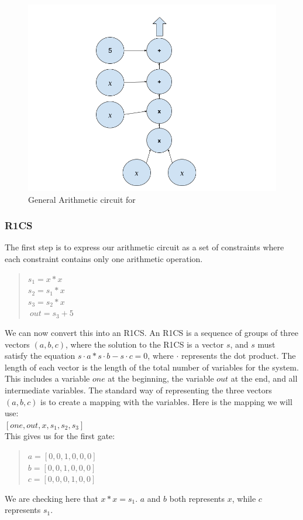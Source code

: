 \begin{figure}[H]
\centering
\includegraphics[width=130mm]{ArithmeticCircuit.png}
\caption{General Arithmetic circuit for }
\label{overflow}
\end{figure}

\subsubsection{R1CS}
\label{subsec:r1cs}
The first step is to express our arithmetic circuit as a set of constraints where each constraint contains only one arithmetic operation.
\begin{quote}
$s_1 = x * x$
\\
$s_2 = s_1 * x$
\\
$s_3 = s_2 * x$
\\
$~out = s_3 + 5$
\end{quote}

We can now convert this into an R1CS.
An R1CS is a sequence of groups of three vectors $(a, b, c)$, where the solution to the R1CS is a vector $s$, and $s$ must satisfy the equation $s \cdot a * s \cdot b - s \cdot c = 0$, where $\cdot$ represents the dot product.
The length of each vector is the length of the total number of variables for the system. This includes a variable $one$ at the beginning, the variable $out$ at the end, and all intermediate variables.
The standard way of representing the three vectors $(a, b, c)$ is to create a mapping with the variables.
Here is the mapping we will use:
\\ 
$[one,out,x,s_1,s_2,s_3]$
\\
This gives us for the first gate:
\begin{quote}
   $a = [0,0,1,0,0,0]$
   \\
   $b = [0,0,1,0,0,0]$
   \\
   $c = [0,0,0,1,0,0]$
\end{quote}
We are checking here that $x*x=s_1$.
$a$ and $b$ both represents $x$, while $c$ represents $s_1$.

